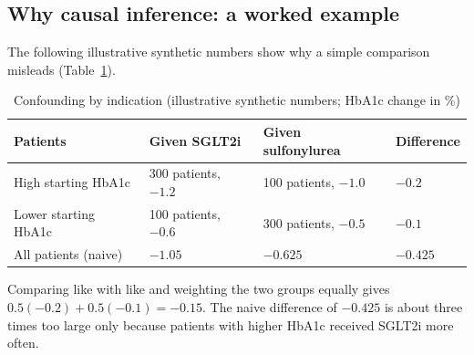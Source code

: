 \subsection{Why causal inference: a worked example}
The following illustrative synthetic numbers show why a simple comparison misleads (Table~\ref{tab:confound}).
\begin{table}[H]\centering\small
\caption{Confounding by indication (illustrative synthetic numbers; HbA1c change in \%)}\label{tab:confound}
\begin{tabular}{llll}\toprule
Patients & Given SGLT2i & Given sulfonylurea & Difference\\\midrule
High starting HbA1c & 300 patients, $-1.2$ & 100 patients, $-1.0$ & $-0.2$\\
Lower starting HbA1c & 100 patients, $-0.6$ & 300 patients, $-0.5$ & $-0.1$\\
All patients (naive) & $-1.05$ & $-0.625$ & $-0.425$\\\bottomrule
\end{tabular}\end{table}
Comparing like with like and weighting the two groups equally gives $0.5(-0.2)+0.5(-0.1)=-0.15$. The naive difference of $-0.425$ is about three times too large only because patients with higher HbA1c received SGLT2i more often.

